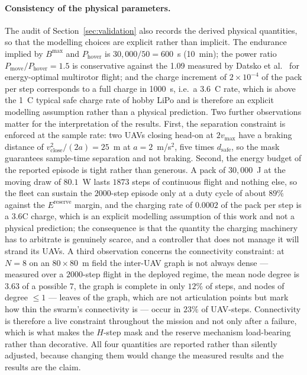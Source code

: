 \documentclass[conference]{IEEEtran}
\newcommand{\tokCsixDegree}{3.63}
\newcommand{\tokCsixMaxdeg}{7}
\newcommand{\tokDutyCycle}{89}
\newcommand{\tokEpisodeSteps}{2000}
\newcommand{\tokMoveDrawW}{80.1}
\newcommand{\tokPackStepsMoving}{1873}
\begin{document}
\paragraph{Consistency of the physical parameters.}
The audit of Section~\ref{sec:validation} also records the derived physical
quantities, so that the modelling choices are explicit rather than implicit.
The endurance implied by $B^{\max}$ and $P_{\mathrm{hover}}$ is
$30{,}000/50=600$~s (10~min); the power ratio $P_{\mathrm{move}}/P_{\mathrm{hover}}=1.5$ is conservative against the 1.09 measured by Datsko et al.~\cite{datsko2024} for energy-optimal multirotor flight; and the charge increment of $2\times10^{-4}$ of the pack per step corresponds to a full charge in 1000~s, i.e.\ a 3.6~C rate, which is above the 1~C typical safe charge rate of hobby LiPo and is therefore an explicit modelling assumption rather than a physical prediction. Two further observations matter for the interpretation of the results. First, the separation constraint is enforced at the sample rate: two UAVs closing head-on at $2v_{\max}$ have a braking distance of $v_{\mathrm{close}}^{2}/(2a)=25$~m at $a=2$~m/s$^2$, five times $d_{\mathrm{safe}}$, so the mask guarantees sample-time separation and not braking. Second, the energy budget of the reported episode is tight rather than generous. A pack of $30{,}000$~J at the moving draw of $\tokMoveDrawW$~W lasts $\tokPackStepsMoving$ steps of continuous flight and nothing else, so the fleet can sustain the $\tokEpisodeSteps$-step episode only at a duty cycle of about $\tokDutyCycle\%$ against the $E^{\mathrm{reserve}}$ margin, and the charging rate of $0.0002$ of the pack per step is a $3.6$C charge, which is an explicit modelling assumption of this work and not a physical prediction; the consequence is that the quantity the charging machinery has to arbitrate is genuinely scarce, and a controller that does not manage it will strand its UAVs. A third observation concerns the connectivity constraint: at $N=8$ on an $80\times80$~m field the inter-UAV graph is not always dense --- measured over a $\tokEpisodeSteps$-step flight in the deployed regime, the mean node degree is $\tokCsixDegree$ of a possible $\tokCsixMaxdeg$, the graph is complete in only $12\%$ of steps, and nodes of degree $\le 1$ --- leaves of the graph, which are not articulation points but mark how thin the swarm's connectivity is --- occur in $23\%$ of UAV-steps. Connectivity is therefore a live constraint throughout the mission and not only after a failure, which is what makes the $H$-step mask and the reserve mechanism load-bearing rather than decorative. All four quantities are reported rather than silently adjusted, because changing them would change the measured results and the results are the claim.
\end{document}
